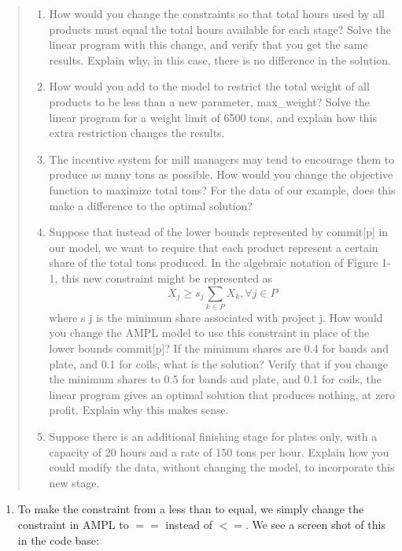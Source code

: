\documentclass[11pt]{article}
\begin{document}
\begin{enumerate}
\begin{quote}
\begin{enumerate}
\item How would you change the constraints so that total hours used by all products must equal the total hours available for each stage? Solve the linear program with this change, and verify that you
get the same results. Explain why, in this case, there is no difference in the solution.
\item How would you add to the model to restrict the total weight of all products to be less than a
new parameter, max\_weight? Solve the linear program for a weight limit of 6500 tons, and
explain how this extra restriction changes the results.
\item The incentive system for mill managers may tend to encourage them to produce as many tons as
possible. How would you change the objective function to maximize total tons? For the data of
our example, does this make a difference to the optimal solution?
\item Suppose that instead of the lower bounds represented by commit[p] in our model, we want to
require that each product represent a certain share of the total tons produced. In the algebraic notation of Figure 1-1, this new constraint might be represented as
\[
X_j \geq s_j\sum_{k\in P} X_k, \forall j \in P
\]
where s j is the minimum share associated with project j. How would you change the AMPL model
to use this constraint in place of the lower bounds commit[p]? If the minimum shares are 0.4 for
bands and plate, and 0.1 for coils, what is the solution?  Verify that if you change the minimum shares to 0.5 for bands and plate, and 0.1 for coils, the linear program gives an optimal solution that produces nothing, at zero profit. Explain why this makes sense.
\item Suppose there is an additional finishing stage for plates only, with a capacity of 20 hours and a
rate of 150 tons per hour. Explain how you could modify the data, without changing the model, to
incorporate this new stage.
\end{enumerate}
\end{quote}

\begin{enumerate}
\item To make the constraint from a less than to equal, we simply change the constraint in AMPL to $==$ instead of $<=$.  We see a screen shot of this in the code base:


\end{enumerate}
\end{enumerate}
\end{document}
